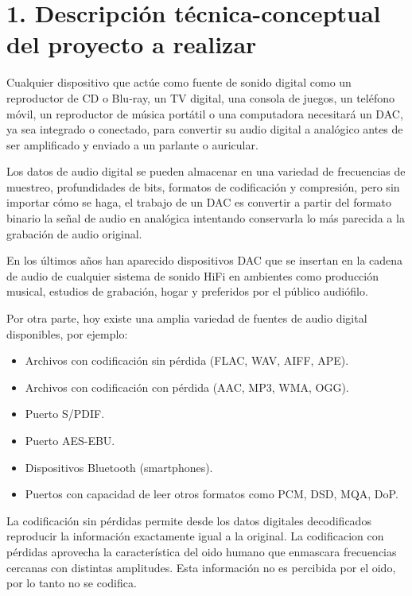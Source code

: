\documentclass[
11pt, %
]{charter}
\begin{document}
\section{1. Descripción técnica-conceptual del proyecto a realizar}
\label{sec:descripcion}

Cualquier dispositivo que actúe como fuente de sonido digital como un reproductor de CD o Blu-ray, un TV digital, una consola de juegos, un teléfono móvil, un reproductor de música portátil o una computadora necesitará un DAC, ya sea integrado o conectado, para convertir su audio digital a analógico antes de ser amplificado y enviado a un parlante o auricular.

Los datos de audio digital se pueden almacenar en una variedad de frecuencias de muestreo, profundidades de bits, formatos de codificación y compresión, pero sin importar cómo se haga, el trabajo de un DAC es convertir a partir del formato binario la señal de audio en analógica intentando conservarla lo más parecida a la grabación de audio original.
 
En los últimos años han aparecido dispositivos DAC que se insertan en la cadena de audio de cualquier sistema de sonido HiFi en ambientes como producción musical, estudios de grabación, hogar y preferidos por el público audiófilo. 

Por otra parte, hoy existe una amplia variedad de fuentes de audio digital disponibles, por ejemplo:

\begin{itemize}
	\item Archivos con codificación sin pérdida (FLAC, WAV, AIFF, APE).
	\item Archivos con codificación con pérdida (AAC, MP3, WMA, OGG).
	\item Puerto S/PDIF.
	\item Puerto AES-EBU.
	\item Dispositivos Bluetooth (smartphones).
	\item Puertos con capacidad de leer otros formatos como PCM, DSD, MQA, DoP. 
\end{itemize}

La codificación sin pérdidas permite desde los datos digitales decodificados reproducir la información exactamente igual a la original.
La codificacion con pérdidas aprovecha la característica del oido humano que enmascara frecuencias cercanas con distintas amplitudes. Esta información no es percibida por el oido, por lo tanto no se codifica.    
\end{document}
